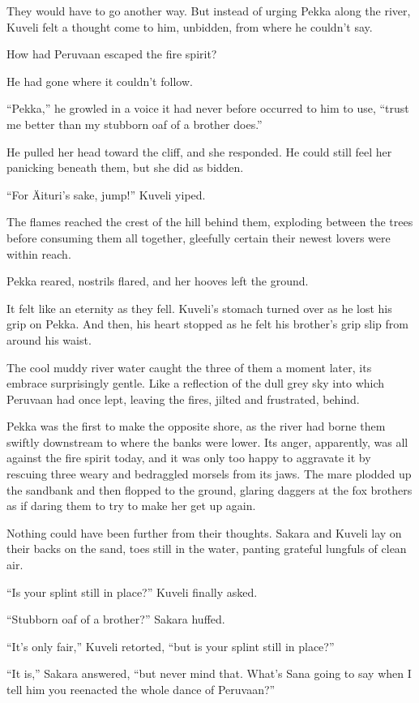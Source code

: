They would have to go another way. But instead of urging Pekka along the river, Kuveli felt a thought come to him, unbidden, from where he couldn't say.

How had Peruvaan escaped the fire spirit?

He had gone where it couldn't follow.

``Pekka,'' he growled in a voice it had never before occurred to him to use, ``trust me better than my stubborn oaf of a brother does.''

He pulled her head toward the cliff, and she responded. He could still feel her panicking beneath them, but she did as bidden.

``For Äituri's sake, jump!'' Kuveli yiped.

The flames reached the crest of the hill behind them, exploding between the trees before consuming them all together, gleefully certain their newest lovers were within reach.

Pekka reared, nostrils flared, and her hooves left the ground.

It felt like an eternity as they fell. Kuveli's stomach turned over as he lost his grip on Pekka. And then, his heart stopped as he felt his brother's grip slip from around his waist.

The cool muddy river water caught the three of them a moment later, its embrace surprisingly gentle. Like a reflection of the dull grey sky into which Peruvaan had once lept, leaving the fires, jilted and frustrated, behind.

Pekka was the first to make the opposite shore, as the river had borne them swiftly downstream to where the banks were lower. Its anger, apparently, was all against the fire spirit today, and it was only too happy to aggravate it by rescuing three weary and bedraggled morsels from its jaws. The mare plodded up the sandbank and then flopped to the ground, glaring daggers at the fox brothers as if daring them to try to make her get up again.

Nothing could have been further from their thoughts. Sakara and Kuveli lay on their backs on the sand, toes still in the water, panting grateful lungfuls of clean air.

``Is your splint still in place?'' Kuveli finally asked.

``Stubborn oaf of a brother?'' Sakara huffed.

``It's only fair,'' Kuveli retorted, ``but is your splint still in place?''

``It is,'' Sakara answered, ``but never mind that. What's Sana going to say when I tell him you reenacted the whole dance of Peruvaan?''


